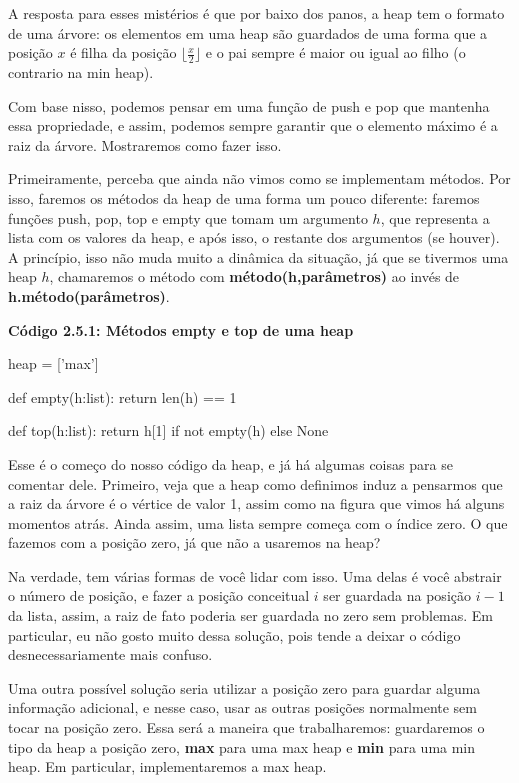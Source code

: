 \documentclass[11pt, a4paper]{article}
\begin{document}
A resposta para esses mistérios é que por baixo dos panos, a heap tem o formato de uma árvore: os elementos em uma heap são guardados de uma forma que a posição \(x\) é filha da posição \(\lfloor \frac{x}{2}\rfloor\) e o pai sempre é maior ou igual ao filho (o contrario na min heap).

Com base nisso, podemos pensar em uma função de push e pop que mantenha essa propriedade, e assim, podemos sempre garantir que o elemento máximo é a raiz da árvore. Mostraremos como fazer isso.

Primeiramente, perceba que ainda não vimos como se implementam métodos. Por isso, faremos os métodos da heap de uma forma um pouco diferente: faremos funções push, pop, top e empty que tomam um argumento \(h\), que representa a lista com os valores da heap, e após isso, o restante dos argumentos (se houver). A princípio, isso não muda muito a dinâmica da situação, já que se tivermos uma heap \(h\), chamaremos o método com \textbf{método(h,parâmetros)} ao invés de \textbf{h.método(parâmetros)}.

\textbf{Código 2.5.1: Métodos empty e top de uma heap}

\begin{code}
heap = ['max']

def empty(h:list):
    return len(h) == 1

def top(h:list):
    return h[1] if not empty(h) else None
\end{code}

Esse é o começo do nosso código da heap, e já há algumas coisas para se comentar dele. Primeiro, veja que a heap como definimos induz a pensarmos que a raiz da árvore é o vértice de valor 1, assim como na figura que vimos há alguns momentos atrás. Ainda assim, uma lista sempre começa com o índice zero. O que fazemos com a posição zero, já que não a usaremos na heap?

Na verdade, tem várias formas de você lidar com isso. Uma delas é você abstrair o número de posição, e fazer a posição conceitual \(i\) ser guardada na posição \(i-1\) da lista, assim, a raiz de fato poderia ser guardada no zero sem problemas. Em particular, eu não gosto muito dessa solução, pois tende a deixar o código desnecessariamente mais confuso.

Uma outra possível solução seria utilizar a posição zero para guardar alguma informação adicional, e nesse caso, usar as outras posições normalmente sem tocar na posição zero. Essa será a maneira que trabalharemos: guardaremos o tipo da heap a posição zero, \textbf{max} para uma max heap e \textbf{min} para uma min heap. Em particular, implementaremos a max heap.
\end{document}
